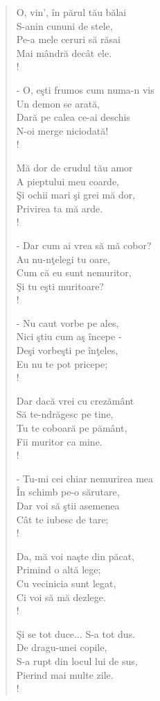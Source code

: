 \documentclass{article}
\begin{document}
\begin{small}
\begin{multicols}{3}
\begin{verse}
O, vin', în părul tău bălai \\
S-anin cununi de stele, \\
Pe-a mele ceruri să răsai \\
Mai mândră decât ele. \\!

- O, eşti frumos cum numa-n vis \\
Un demon se arată, \\
Dară pe calea ce-ai deschis \\
N-oi merge niciodată! \\!

Mă dor de crudul tău amor \\
A pieptului meu coarde, \\
Şi ochii mari şi grei mă dor, \\
Privirea ta mă arde. \\!

- Dar cum ai vrea să mă cobor? \\
Au nu-nţelegi tu oare, \\
Cum că eu sunt nemuritor, \\
Şi tu eşti muritoare? \\!

- Nu caut vorbe pe ales, \\
Nici ştiu cum aş începe - \\
Deşi vorbeşti pe înţeles, \\
Eu nu te pot pricepe; \\!

Dar dacă vrei cu crezământ \\
Să te-ndrăgesc pe tine, \\
Tu te coboară pe pământ, \\
Fii muritor ca mine. \\!

- Tu-mi cei chiar nemurirea mea \\
În schimb pe-o sărutare, \\
Dar voi să ştii asemenea \\
Cât te iubesc de tare; \\!

Da, mă voi naşte din păcat, \\
Primind o altă lege; \\
Cu vecinicia sunt legat, \\
Ci voi să mă dezlege. \\!

Şi se tot duce... S-a tot dus. \\
De dragu-unei copile, \\
S-a rupt din locul lui de sus, \\
Pierind mai multe zile. \\!


\end{verse}
\end{multicols}
\end{small}
\end{document}
